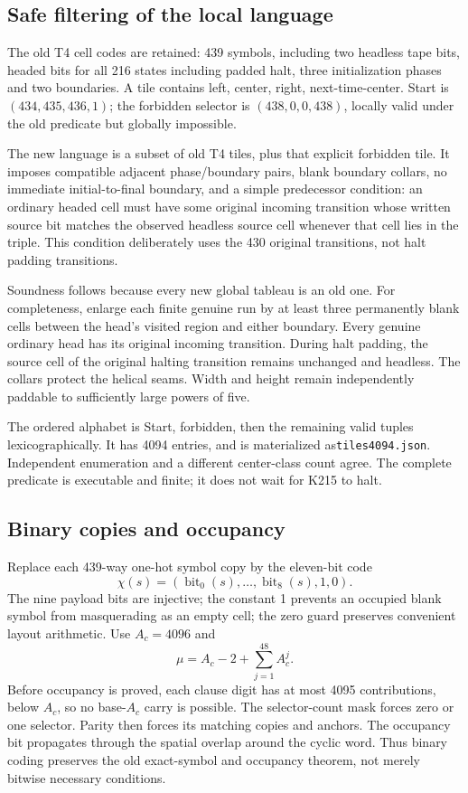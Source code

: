 \documentclass[11 pt]{article}
\begin{document}
\subsection{Safe filtering of the local language}
The old T4 cell codes are retained: 439 symbols, including two headless tape bits, headed bits for all 216 states including padded halt, three initialization phases and two boundaries. A tile contains left, center, right, next-time-center. Start is $(434,435,436,1)$; the forbidden selector is $(438,0,0,438)$, locally valid under the old predicate but globally impossible.

The new language is a subset of old T4 tiles, plus that explicit forbidden tile. It imposes compatible adjacent phase/boundary pairs, blank boundary collars, no immediate initial-to-final boundary, and a simple predecessor condition: an ordinary headed cell must have some original incoming transition whose written source bit matches the observed headless source cell whenever that cell lies in the triple. This condition deliberately uses the 430 original transitions, not halt padding transitions.

Soundness follows because every new global tableau is an old one. For completeness, enlarge each finite genuine run by at least three permanently blank cells between the head's visited region and either boundary. Every genuine ordinary head has its original incoming transition. During halt padding, the source cell of the original halting transition remains unchanged and headless. The collars protect the helical seams. Width and height remain independently paddable to sufficiently large powers of five.

The ordered alphabet is Start, forbidden, then the remaining valid tuples lexicographically. It has 4094 entries, and is materialized as\texttt{tiles4094.json}. Independent enumeration and a different center-class count agree. The complete predicate is executable and finite; it does not wait for K215 to halt.

\subsection{Binary copies and occupancy}
Replace each 439-way one-hot symbol copy by the eleven-bit code
\[
\chi(s)=(\operatorname{bit}_0(s),\ldots,\operatorname{bit}_8(s), 1,0).
\]
The nine payload bits are injective; the constant 1 prevents an occupied blank symbol from masquerading as an empty cell; the zero guard preserves convenient layout arithmetic. Use $ A_c=4096 $ and
\[
\mu=A_c-2+\sum_{j=1}^{48}A_c^j.
\]
Before occupancy is proved, each clause digit has at most 4095 contributions, below $ A_c $, so no base-$ A_c $ carry is possible. The selector-count mask forces zero or one selector. Parity then forces its matching copies and anchors. The occupancy bit propagates through the spatial overlap around the cyclic word. Thus binary coding preserves the old exact-symbol and occupancy theorem, not merely bitwise necessary conditions.
\end{document}
